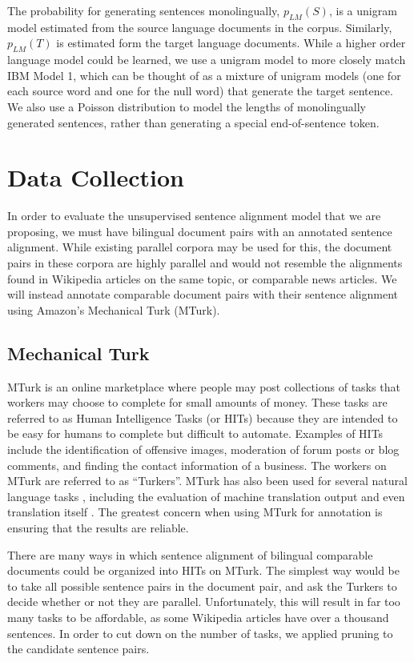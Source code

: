 The probability for generating sentences monolingually, $p_{LM}(S)$, is a
unigram model estimated from the source language documents in the corpus.
Similarly, $p_{LM}(T)$ is estimated form the target language documents. While a
higher order language model could be learned, we use a unigram model to more
closely match IBM Model 1, which can be thought of as a mixture of unigram
models (one for each source word and one for the null word) that generate the
target sentence. We also use a Poisson distribution to model the lengths of 
monolingually generated sentences, rather than generating a special
end-of-sentence token.

\section{Data Collection}
\label{sec:data}
In order to evaluate the unsupervised sentence alignment model that we are
proposing, we must have bilingual document pairs with an annotated sentence
alignment. While existing parallel corpora may be used for this, the document
pairs in these corpora are highly parallel and would not resemble the alignments
found in Wikipedia articles on the same topic, or comparable news articles. We
will instead annotate comparable document pairs with their sentence alignment
using Amazon's Mechanical Turk (MTurk). 

\subsection{Mechanical Turk}

MTurk is an online marketplace where people may post collections of tasks
that workers may choose to complete for small amounts of money. These tasks are
referred to as Human Intelligence Tasks (or HITs) because they are intended to
be easy for humans to complete but difficult to automate. Examples of HITs
include the identification of offensive images, moderation of forum posts or
blog comments, and finding the contact information of a business. The workers on
MTurk are referred to as ``Turkers''.
MTurk has also been used for several natural language tasks \citep{Snow08},
including the evaluation of machine translation output \citep{Callison-Burch09}
and even translation itself \citep{Zaidan11}. The greatest concern when using
MTurk for annotation is ensuring that the results are reliable.

There are many ways in which sentence alignment of bilingual comparable
documents could be organized into HITs on MTurk. The simplest way would be to
take all possible sentence pairs in the document pair, and ask the Turkers to decide
whether or not they are parallel. Unfortunately, this will result in far too
many tasks to be affordable, as some Wikipedia articles have over a thousand
sentences. In order to cut down on the number of tasks, we applied pruning to
the candidate sentence pairs.

